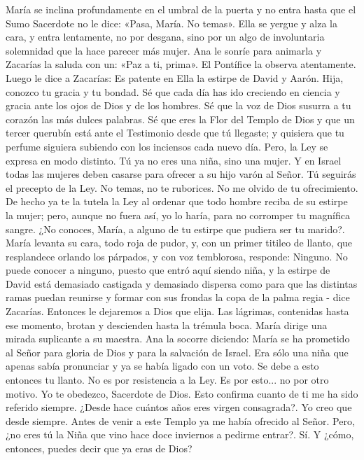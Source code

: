\documentclass[12pt]{book} %
\begin{document}
María se inclina profundamente en el umbral de la puerta y no entra hasta que el Sumo Sacerdote no le dice: «Pasa, María. No temas». Ella se yergue y alza la cara, y entra lentamente, no por desgana, sino por un algo de involuntaria solemnidad que la hace parecer más mujer. 
Ana le sonríe para animarla y Zacarías la saluda con un: «Paz a ti, prima». 
El Pontífice la observa atentamente. Luego le dice a Zacarías: 
Es patente en Ella la estirpe de David y Aarón. 
Hija, conozco tu gracia y tu bondad. Sé que cada día has ido creciendo en ciencia y gracia ante los ojos de Dios y de los hombres. Sé que la voz de Dios susurra a tu corazón las más dulces palabras. Sé que eres la Flor del Templo de Dios y que un tercer querubín está ante el Testimonio desde que tú llegaste; y quisiera que tu perfume siguiera subiendo con los inciensos cada nuevo día. Pero, la Ley se expresa en modo distinto. Tú ya no eres una niña, sino una mujer. Y en Israel todas las mujeres deben casarse para ofrecer a su hijo varón al Señor. Tú seguirás el precepto de la Ley. No temas, no te ruborices. No me olvido de tu ofrecimiento. De hecho ya te la tutela la Ley al ordenar que todo hombre reciba de su estirpe la mujer; pero, aunque no fuera así, yo lo haría, para no corromper tu magnífica sangre. ¿No conoces, María, a alguno de tu estirpe que pudiera ser tu marido?. 
María levanta su cara, todo roja de pudor, y, con un primer titileo de llanto, que resplandece orlando los párpados, y con voz temblorosa, responde: 
Ninguno. 
No puede conocer a ninguno, puesto que entró aquí siendo niña, y la estirpe de David está demasiado castigada y 
demasiado dispersa como para que las distintas ramas puedan reunirse y formar con sus frondas la copa de la palma regia - dice Zacarías. 
Entonces le dejaremos a Dios que elija. 
Las lágrimas, contenidas hasta ese momento, brotan y descienden hasta la trémula boca. María dirige una mirada 
suplicante a su maestra. 
Ana la socorre diciendo: 
María se ha prometido al Señor para gloria de Dios y para la salvación de Israel. Era sólo una niña que apenas sabía 
pronunciar y ya se había ligado con un voto. 
Se debe a esto entonces tu llanto. No es por resistencia a la Ley. 
Es por esto... no por otro motivo. Yo te obedezco, Sacerdote de Dios. 
Esto confirma cuanto de ti me ha sido referido siempre. ¿Desde hace cuántos años eres virgen consagrada?. 
Yo creo que desde siempre. Antes de venir a este Templo ya me había ofrecido al Señor. 
Pero, ¿no eres tú la Niña que vino hace doce inviernos a pedirme entrar?. 
Sí. 
Y ¿cómo, entonces, puedes decir que ya eras de Dios? 
\end{document}
